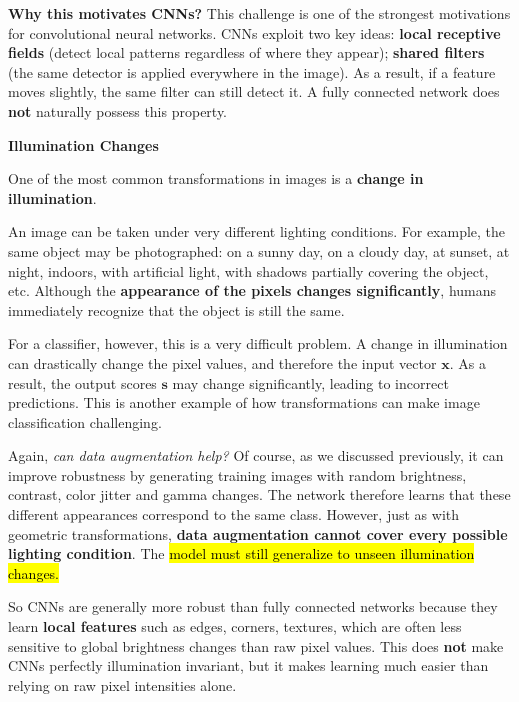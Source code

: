 \highspace
\textcolor{Green3}{ \textbf{Why this motivates CNNs?}} This challenge is one of the strongest motivations for convolutional neural networks. CNNs exploit two key ideas: \textbf{local receptive fields} (detect local patterns regardless of where they appear); \textbf{shared filters} (the same detector is applied everywhere in the image). As a result, if a feature moves slightly, the same filter can still detect it. A fully connected network does \textbf{not} naturally possess this property.

\newpage

\begin{flushleft}
    \textcolor{Green3}{ \textbf{Illumination Changes}}
\end{flushleft}
One of the most common transformations in images is a \textbf{change in illumination}.

\highspace
An image can be taken under very different lighting conditions. For example, the same object may be photographed: on a sunny day, on a cloudy day, at sunset, at night, indoors, with artificial light, with shadows partially covering the object, etc. Although the \textbf{appearance of the pixels changes significantly}, humans immediately recognize that the object is still the same.

\highspace
For a classifier, however, this is a very difficult problem. A change in illumination can drastically change the pixel values, and therefore the input vector $\mathbf{x}$. As a result, the output scores $\mathbf{s}$ may change significantly, leading to incorrect predictions. This is another example of how transformations can make image classification challenging.

\highspace
Again, \emph{can data augmentation help?} Of course, as we discussed previously, it can improve robustness by generating training images with random brightness, contrast, color jitter and gamma changes. The network therefore learns that these different appearances correspond to the same class. However, just as with geometric transformations, \textbf{data augmentation cannot cover every possible lighting condition}. The \hl{model must still generalize to unseen illumination changes.}

\highspace
So CNNs are generally more robust than fully connected networks because they learn \textbf{local features} such as edges, corners, textures, which are often less sensitive to global brightness changes than raw pixel values. This does \textbf{not} make CNNs perfectly illumination invariant, but it makes learning much easier than relying on raw pixel intensities alone.

